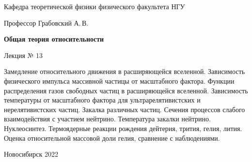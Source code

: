 \documentclass[12pt,pagesize,paper=192mm:108mm,landscape]{scrbook}
\begin{document}
\begin{titlepage}
\begin{center}
    Кафедра теоретической физики физического факультета НГУ

    \Large
    Профессор Грабовский А.\,В.

    \huge
    \textbf{Общая теория относительности}

    \Large
    Лекция № 13
    \vfill

    \normalsize
    \begin{minipage}{0.9\linewidth}
      Замедление относительного движения в расширяющейся
      вселенной. Зависимость физического импульса массивной частицы от
      масштабного фактора. Функции распределения газов свободных
      частиц в расширяющейся вселенной. Зависимость температуры от
      масштабного фактора для ультрарелятивистских и нерелятивистских
      частиц. Закалка различных частиц. Сечения процессов слабого
      взаимодействия с участием нейтрино. Температура закалки
      нейтрино. Нуклеосинтез. Термоядерные реакции рождения дейтерия,
      трития, гелия, лития. Оценка относительной массовой доли гелия,
      сравнение с наблюдениями.
     \end{minipage}
    \vfill

    \normalsize \ccbysa\hspace{0.5em}  Новосибирск 2022
  \end{center}
\end{titlepage}
\end{document}
